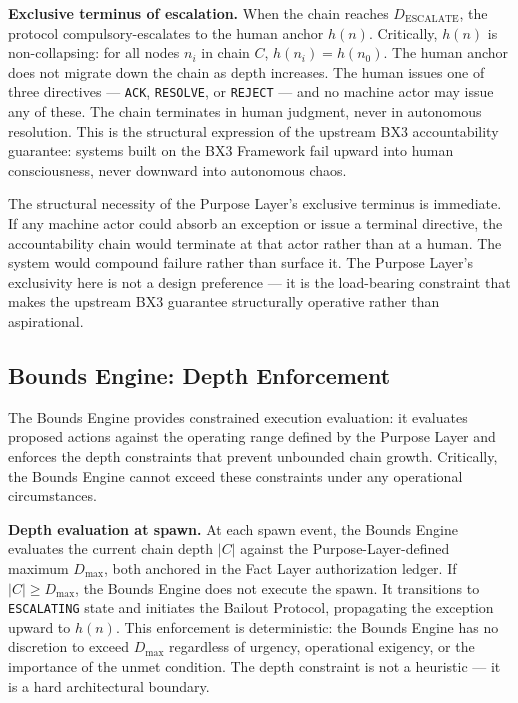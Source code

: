 \medskip
\noindent\textbf{Exclusive terminus of escalation.} When the chain reaches $D_{\mathrm{ESCALATE}}$, the protocol compulsory-escalates to the human anchor $h(n)$. Critically, $h(n)$ is non-collapsing: for all nodes $n_i$ in chain $C$, $h(n_i) = h(n_0)$. The human anchor does not migrate down the chain as depth increases. The human issues one of three directives — \texttt{ACK}, \texttt{RESOLVE}, or \texttt{REJECT} — and no machine actor may issue any of these. The chain terminates in human judgment, never in autonomous resolution. This is the structural expression of the upstream BX3 accountability guarantee: systems built on the BX3 Framework fail upward into human consciousness, never downward into autonomous chaos.

The structural necessity of the Purpose Layer's exclusive terminus is immediate. If any machine actor could absorb an exception or issue a terminal directive, the accountability chain would terminate at that actor rather than at a human. The system would compound failure rather than surface it. The Purpose Layer's exclusivity here is not a design preference — it is the load-bearing constraint that makes the upstream BX3 guarantee structurally operative rather than aspirational.

\subsection{Bounds Engine: Depth Enforcement}
\label{sec:rs-bounds-depth}

The Bounds Engine provides constrained execution evaluation: it evaluates proposed actions against the operating range defined by the Purpose Layer and enforces the depth constraints that prevent unbounded chain growth. Critically, the Bounds Engine cannot exceed these constraints under any operational circumstances.

\medskip
\noindent\textbf{Depth evaluation at spawn.} At each spawn event, the Bounds Engine evaluates the current chain depth $|C|$ against the Purpose-Layer-defined maximum $D_{\mathrm{max}}$, both anchored in the Fact Layer authorization ledger. If $|C| \geq D_{\mathrm{max}}$, the Bounds Engine does not execute the spawn. It transitions to \texttt{ESCALATING} state and initiates the Bailout Protocol, propagating the exception upward to $h(n)$. This enforcement is deterministic: the Bounds Engine has no discretion to exceed $D_{\mathrm{max}}$ regardless of urgency, operational exigency, or the importance of the unmet condition. The depth constraint is not a heuristic — it is a hard architectural boundary.

